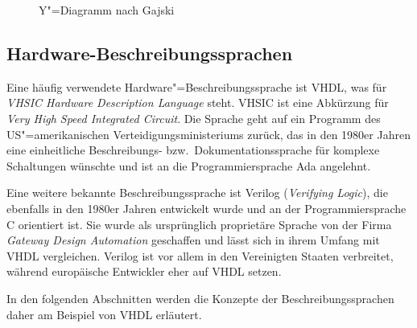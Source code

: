 \begin{figure}[htb]
    \caption{Y"=Diagramm nach Gajski \cite[nach][10]{kesel2013}}
    \label{fpga:entwicklung:ydiagramm}
\end{figure}

\subsection{Hardware-Beschreibungssprachen}\label{fpga:entwicklung:hdl}

Eine häufig verwendete Hardware"=Beschreibungssprache ist VHDL, was für
\textit{VHSIC Hardware Description Language} steht. VHSIC ist eine Abkürzung
für \textit{Very High Speed Integrated Circuit}. Die Sprache geht auf ein
Programm des US"=amerikanischen Verteidigungsministeriums zurück, das in den
1980er Jahren eine einheitliche Beschreibungs- bzw.\ Dokumentationssprache für
komplexe Schaltungen wünschte und ist an die Programmiersprache Ada angelehnt.
\cite[vgl.][22]{kesel2013}

Eine weitere bekannte Beschreibungssprache ist Verilog
(\textit{Verifying Logic}), die ebenfalls in den 1980er Jahren entwickelt wurde
und an der Programmiersprache C orientiert ist. Sie wurde als ursprünglich
proprietäre Sprache von der Firma \textit{Gateway Design Automation} geschaffen
und lässt sich in ihrem Umfang mit VHDL vergleichen. Verilog ist vor allem in
den Vereinigten Staaten verbreitet, während europäische Entwickler eher auf VHDL
setzen. \cite[vgl.][24--25]{kesel2013}

In den folgenden Abschnitten werden die Konzepte der Beschreibungssprachen daher
am Beispiel von VHDL erläutert.


